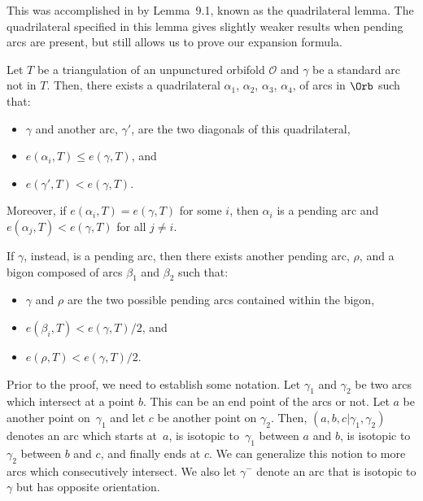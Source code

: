 This was accomplished in \cite{MSW} by Lemma~9.1, known as the quadrilateral lemma. The quadrilateral specified in this lemma gives slightly weaker results when pending arcs are present, but still allows us to prove our expansion formula.

\begin{Lemma}\label{lem:QuadAndBigon}
Let $T$ be a triangulation of an unpunctured orbifold $\mathcal{O}$ and $\gamma$ be a standard arc not in $T$. Then, there exists a quadrilateral $\alpha_1$, $\alpha_2$, $\alpha_3$, $\alpha_4$, of arcs in $\Orb$ such that:
\begin{itemize}\itemsep=0pt
\item $\gamma$ and another arc, $\gamma'$, are the two diagonals of this quadrilateral,
\item $e(\alpha_i, T) \leq e(\gamma, T)$, and
\item $e(\gamma', T) < e(\gamma, T)$.
\end{itemize}

Moreover, if $e(\alpha_i,T) = e(\gamma,T)$ for some $i$, then $\alpha_i$ is a pending arc and ${e(\alpha_j,T) < e(\gamma,T)}$ for all $j \neq i$.

If $\gamma$, instead, is a pending arc, then there exists another pending arc, $\rho$, and a bigon composed of arcs $\beta_1$ and $\beta_2$ such that:
\begin{itemize}\itemsep=0pt
\item $\gamma$ and $\rho$ are the two possible pending arcs contained within the bigon,
\item $e(\beta_i, T) < e(\gamma, T)/2$, and
\item $e(\rho, T) < e(\gamma, T)/2$.
\end{itemize}
\end{Lemma}

Prior to the proof, we need to establish some notation. Let $\gamma_1$ and $\gamma_2$ be two arcs which intersect at a point $b$. This can be an end point of the arcs or not. Let $a$ be another point on~$\gamma_1$ and let $c$ be another point on $\gamma_2$. Then, $(a,b, c\vert \gamma_1,\gamma_2)$ denotes an arc which starts at~$a$, is isotopic to~$\gamma_1$ between $a$ and $b$, is isotopic to $\gamma_2$ between $b$ and $c$, and finally ends at $c$. We can generalize this notion to more arcs which consecutively intersect. We also let $\gamma^-$ denote an arc that is isotopic to $\gamma$ but has opposite orientation.

